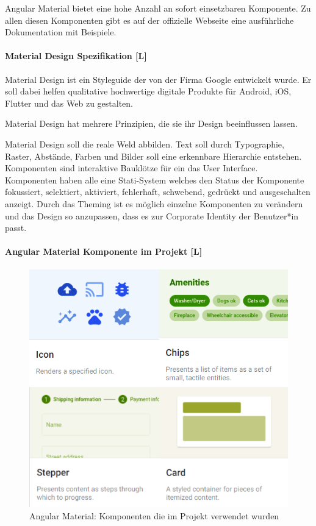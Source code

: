 Angular Material bietet eine hohe Anzahl an sofort einsetzbaren Komponente. Zu allen diesen Komponenten gibt es auf der offizielle Webseite eine ausführliche Dokumentation mit Beispiele. \cite{JavaPointAngularMaterial, WhatAngularMaterial}

\paragraph{Material Design Spezifikation [L]}
Material Design ist ein Styleguide der von der Firma Google entwickelt wurde. Er soll dabei helfen qualitative hochwertige digitale Produkte für Android, iOS, Flutter und das Web zu gestalten.

Material Design hat mehrere Prinzipien, die sie ihr Design beeinflussen lassen.

Material Design soll die reale Weld abbilden.
Text soll durch Typographie, Raster, Abstände, Farben und Bilder soll eine erkennbare Hierarchie entstehen. Komponenten sind interaktive Bauklötze für ein das User Interface. Komponenten haben alle eine Stati-System welches den Status der Komponente fokussiert, selektiert, aktiviert, fehlerhaft, schwebend, gedrückt und ausgeschalten anzeigt. Durch das Theming ist es möglich einzelne Komponenten zu verändern und das Design so anzupassen, dass es zur Corporate Identity der Benutzer*in passt.\cite{MaterialDesign-Introduction}

\paragraph{Angular Material Komponente im Projekt [L]}

\begin{figure}
  \centering
  \includegraphics[scale=0.5]{pics/AngularMaterialKomponent.png}
  \caption{Angular Material: Komponenten die im Projekt verwendet wurden \cite{AngularComponents}}
  \label{architecture:frontend:angular-material-project-components}
\end{figure}

